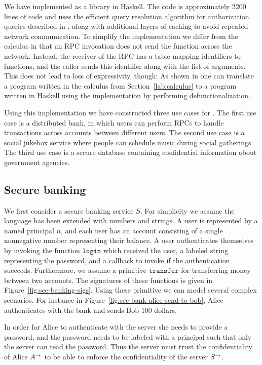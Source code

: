 We have implemented \lang{} as a library in Haskell. The code is approximately 2200 lines of code and uses the efficient query resolution algorithm for authorization queries described in \cite{Arden:2015:FA:2859845.2859998}, along with additional layers of caching to avoid repeated network communication. To simplify the implementation we differ from the calculus in that an RPC invocation does not send the function across the network. Instead, the receiver of the RPC has a table mapping identifiers to functions, and the caller sends this identifier along with the list of arguments. This does not lead to loss of expressivity, though: As shown in \cite{Cooper:2009:RC:1599410.1599439} one can translate a program written in the calculus from Section~\ref{lab:calculus} to a program written in Haskell using the \lang{} implementation by performing defunctionalization.

Using this implementation we have constructed three use cases for \lang. The first use case is a distributed bank, in which users can perform RPCs to handle transactions across accounts between different users. The second use case is a social jukebox service \cite{Lots of citations} where people can schedule music during social gatherings. The third use case is a secure database containing confidential information about government agencies.

\subsection{Secure banking}
We first consider a secure banking service $S$. For simplicity we assume the language has been extended with numbers and strings. A user is represented by a named principal $n$, and each user has an account consisting of a single nonnegative number representing their balance. A user authenticates themselves by invoking the function $\mathtt{login}$ which received the user, a labeled string representing the password, and a callback to invoke if the authentication succeeds. Furthermore, we assume a primitive $\mathtt{transfer}$ for transferring money between two accounts. The signatures of these functions is given in Figure~\ref{fig:sec-banking-sigs}.
Using these primitive we can model several complex scenarios. For instance in Figure~\ref{fig:sec-bank-alice-send-to-bob}, Alice authenticates with the bank and sends Bob 100 dollars.

In order for Alice to authenticate with the server she needs to provide a password, and the password needs to be labeled with a principal such that only the server can read the password. Thus the server must trust the confidentiality of Alice $A^{\rightarrow}$ to be able to enforce the confidentiality of the server $S^{\rightarrow}$. 

